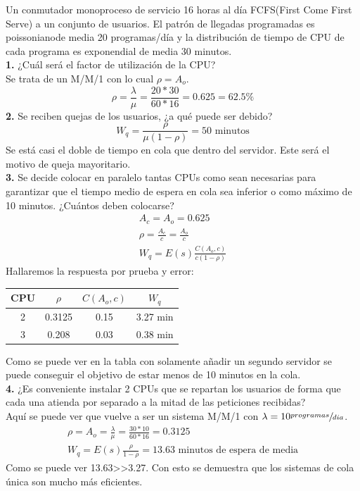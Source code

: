 \begin{exercise}[2]
Un conmutador monoproceso de servicio 16 horas al día FCFS(First Come First Serve) a un conjunto de usuarios. El patrón de llegadas programadas es poissonianode media 20 programas/día y la distribución de tiempo de CPU  de cada programa es exponendial de media 30 minutos.\\
\textbf{1.} ¿Cuál será el factor de utilización de la CPU?\\
Se trata de un M/M/1 con lo cual $\rho=A_o$.\\
\[\rho=\frac{\lambda}{\mu}=\frac{20*30}{60*16}=0.625=62.5\%\]
\textbf{2.} Se reciben quejas de los usuarios, ¿a qué puede ser debido?\\
\[W_q=\frac{\rho}{\mu(1-\rho)}=50\text{ minutos}\]
Se está casi el doble de tiempo en cola que dentro del servidor. Este será el motivo de queja mayoritario.\\
\textbf{3.} Se decide colocar en paralelo tantas CPUs como sean necesarias para garantizar que el tiempo medio de espera en cola sea inferior o como máximo de 10 minutos. ¿Cuántos deben colocarse?\\
\begin{gather*}
A_c=A_o=0.625\\
\rho=\frac{A_c}{c}=\frac{A_o}{c}\\
W_q=E(s)\frac{C(A_o,c)}{c(1-\rho)}
\end{gather*}
Hallaremos la respuesta por prueba y error:
\begin{center}
\begin{tabular}{c|c|c|c}
CPU & $\rho$ & $C(A_o,c)$ & $W_q$ \\\hline
2 & 0.3125 & 0.15 & 3.27 min\\
3 & 0.208 & 0.03 & 0.38 min
\end{tabular}
\end{center}
Como se puede ver en la tabla con solamente añadir un segundo servidor se puede conseguir el objetivo de estar menos de 10 minutos en la cola.\\
\textbf{4.} ¿Es conveniente instalar 2 CPUs que se repartan los usuarios de forma que cada una atienda por separado a la mitad de las peticiones recibidas?\\
Aquí se puede ver que vuelve a ser un sistema M/M/1 con $\lambda=10\sfrac{programas}{dia}$.
\begin{gather*}
\rho=A_o=\frac{\lambda}{\mu}=\frac{30*10}{60*16}=0.3125\\
W_q=E(s)\frac{\rho}{1-\rho}=13.63 \text{ minutos de espera de media}
\end{gather*}
Como se puede ver 13.63\textgreater \textgreater 3.27. Con esto se demuestra que los sistemas de cola única son mucho más eficientes.
\end{exercise}
